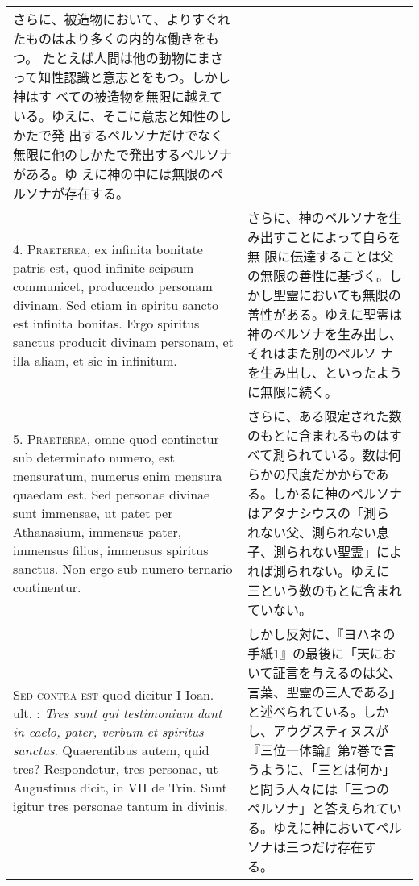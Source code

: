 \documentclass[10pt]{jsarticle} %
\begin{document}
\begin{longtable}{p{21em}p{21em}}
さらに、被造物において、よりすぐれたものはより多くの内的な働きをもつ。
 たとえば人間は他の動物にまさって知性認識と意志とをもつ。しかし神はす
 べての被造物を無限に越えている。ゆえに、そこに意志と知性のしかたで発
 出するペルソナだけでなく無限に他のしかたで発出するペルソナがある。ゆ
 えに神の中には無限のペルソナが存在する。


\\



4. {\scshape Praeterea}, ex infinita bonitate patris est, quod infinite seipsum
communicet, producendo personam divinam. Sed etiam in spiritu sancto
est infinita bonitas. Ergo spiritus sanctus producit divinam personam,
et illa aliam, et sic in infinitum.

&

さらに、神のペルソナを生み出すことによって自らを無
 限に伝達することは父の無限の善性に基づく。しかし聖霊においても無限の
 善性がある。ゆえに聖霊は神のペルソナを生み出し、それはまた別のペルソ
 ナを生み出し、といったように無限に続く。

\\



5. {\scshape Praeterea,} omne quod continetur sub determinato numero, est
mensuratum, numerus enim mensura quaedam est. Sed personae divinae
sunt immensae, ut patet per Athanasium, immensus pater, immensus
filius, immensus spiritus sanctus. Non ergo sub numero ternario
continentur.

&

さらに、ある限定された数のもとに含まれるものはすべて測られている。数は何
 らかの尺度だかからである。しかるに神のペルソナはアタナシウスの「測ら
 れない父、測られない息子、測られない聖霊」によれば測られない。ゆえに
 三という数のもとに含まれていない。


\\



{\scshape Sed contra est} quod dicitur I Ioan. ult. : {\itshape Tres sunt qui testimonium
dant in caelo, pater, verbum et spiritus sanctus}. Quaerentibus autem,
quid tres? Respondetur, tres personae, ut Augustinus dicit, in VII de
Trin. Sunt igitur tres personae tantum in divinis.

&

しかし反対に、『ヨハネの手紙1』の最後に「天において証言を与えるのは父、
 言葉、聖霊の三人である」と述べられている。しかし、アウグスティヌスが
 『三位一体論』第7巻で言うように、「三とは何か」と問う人々には「三つの
 ペルソナ」と答えられている。ゆえに神においてペルソナは三つだけ存在す
 る。


\end{longtable}
\end{document}
